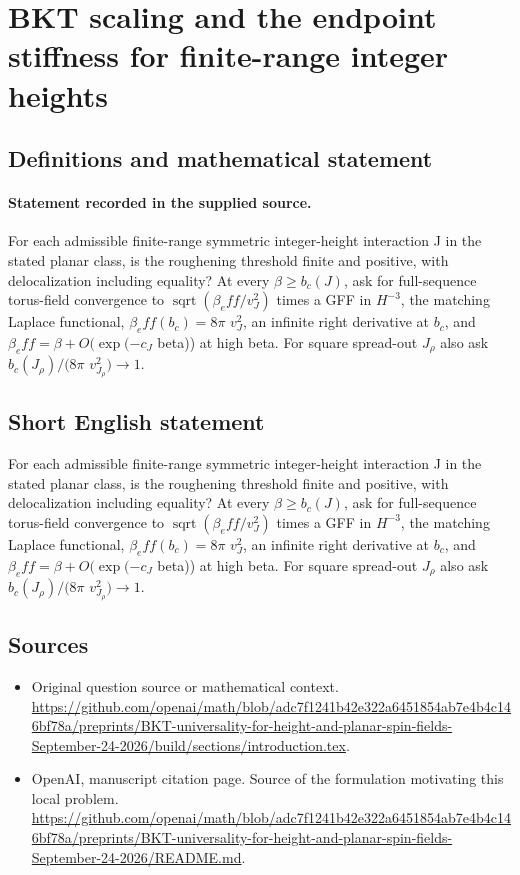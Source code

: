 \documentclass[11pt]{article}
\begin{document}
\section*{BKT scaling and the endpoint stiffness for finite-range integer heights}\label{30007365}
\subsection{Definitions and mathematical statement}
\paragraph{Statement recorded in the supplied source.}
For each admissible finite-range symmetric integer-height interaction J in the stated planar class, is the roughening threshold finite and positive, with delocalization including equality? At every $\beta \geq b_c(J)$, ask for full-sequence torus-field convergence to $\operatorname{sqrt}(\beta _eff/v_J^2)$ times a GFF in $H^{-3}$, the matching Laplace functional, $\beta _eff(b_c)=8\pi $ $v_J^2$, an infinite right derivative at $b_c$, and $\beta _eff=\beta +O(\exp (-c_J$ beta)) at high beta. For square spread-out $J_\rho $ also ask $b_c(J_\rho )/(8\pi $ $v_{J_\rho }^2)\to 1$.
\subsection{Short English statement}
For each admissible finite-range symmetric integer-height interaction J in the stated planar class, is the roughening threshold finite and positive, with delocalization including equality? At every $\beta \geq b_c(J)$, ask for full-sequence torus-field convergence to $\operatorname{sqrt}(\beta _eff/v_J^2)$ times a GFF in $H^{-3}$, the matching Laplace functional, $\beta _eff(b_c)=8\pi $ $v_J^2$, an infinite right derivative at $b_c$, and $\beta _eff=\beta +O(\exp (-c_J$ beta)) at high beta. For square spread-out $J_\rho $ also ask $b_c(J_\rho )/(8\pi $ $v_{J_\rho }^2)\to 1$.
\subsection{Sources}
\begin{itemize}
\item[S1] Original question source or mathematical context.
\url{https://github.com/openai/math/blob/adc7f1241b42e322a6451854ab7e4b4c146bf78a/preprints/BKT-universality-for-height-and-planar-spin-fields-September-24-2026/build/sections/introduction.tex}.
\item[S2] OpenAI, manuscript citation page. Source of the formulation motivating this local problem.
\url{https://github.com/openai/math/blob/adc7f1241b42e322a6451854ab7e4b4c146bf78a/preprints/BKT-universality-for-height-and-planar-spin-fields-September-24-2026/README.md}.
\end{itemize}
\end{document}
